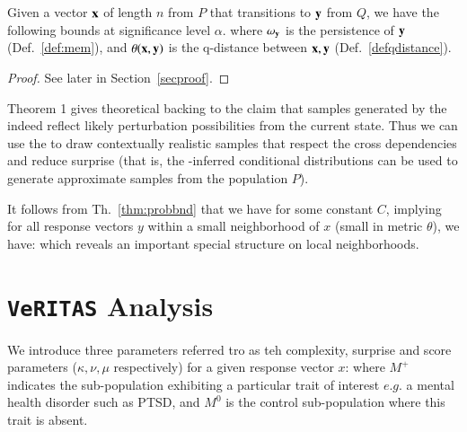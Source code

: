 \documentclass[onecolumn,10pt]{IEEEtran}
\def\vrts{\texttt{VeRITAS}\xspace}
\begin{document}
\begin{thm}\label{thm:probbnd}
  Given a vector $\bm{\mathrm{x}}$ of length $n$ from $P$ that transitions to $\bm{\mathrm{y}}$ from $Q$, we have the following bounds at significance level $\alpha$.
  where $\omega_{\bm{\mathrm{y}}}$ is the persistence of  $\bm{\mathrm{y}}$  (Def.~\ref{def:mem}), and $\theta(\bm{\mathrm{x}},\bm{\mathrm{y}})$ is the q-distance between $\bm{\mathrm{x}},\bm{\mathrm{y}}$ (Def.~\ref{defqdistance}).
\end{thm}

\begin{proof}
  See later in Section~\ref{secproof}.
\end{proof}

Theorem 1 gives theoretical backing to the claim that samples generated by the \qnet indeed reflect likely perturbation possibilities from the current state.  Thus we can use the \qnet to draw contextually realistic samples that respect the  cross dependencies and reduce surprise  (that is, the \qnet-inferred conditional distributions can be used to  generate approximate samples from the population $P$).  %

\begin{rem}\label{rem:neighborhood}
  It follows from Th.~\ref{thm:probbnd} that we have for some constant $C$,
  implying for all response vectors $y$ within a small neighborhood of $x$ (small in metric $\theta$), we
  have:
  which reveals an important special structure on local neighborhoods.
\end{rem}

\section{\vrts Analysis}

\begin{defn}[Algorithm \vrts Parameters]\label{defvrts}
  We introduce three parameters referred tro as teh complexity, surprise and score parameters ($\kappa,\nu,\mu$ respectively) for a given response vector $x$:
  where $M^+$ indicates the sub-population exhibiting  a particular trait of interest $e.g.$ a mental health disorder such as PTSD, and $M^0$ is the control sub-population where this trait is absent.
\end{defn}
\end{document}
